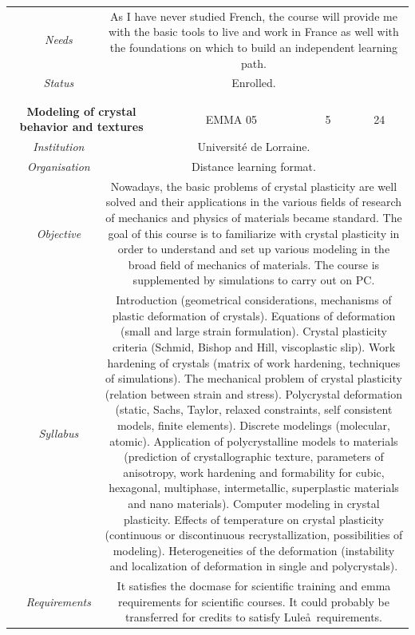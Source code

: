 \documentclass[a4paper, twoside,12pt, abstract]{scrartcl} %
\begin{document}
\begin{center}
\begin{longtable}{cccccc}
   &\textit{Needs}&\multicolumn{4}{p{0.7\textwidth}}{As I have never studied French, the course will provide me with the basic tools to live and work in France as well with the foundations on which to build an independent learning path.}\\
   &\textit{Status}&\multicolumn{4}{p{0.7\textwidth}}{Enrolled.}\\
   &&&&&\\
   \midrule
    &&&&&\\
    \multicolumn{3}{p{0.5\textwidth}}{\textbf{Modeling of crystal behavior and textures}}&EMMA 05&5&24\\
    &\textit{Institution}&\multicolumn{4}{p{0.7\textwidth}}{Universit\'e de Lorraine.}\\
    &\textit{Organisation}&\multicolumn{4}{p{0.7\textwidth}}{Distance learning format.}\\
    &\textit{Objective}&\multicolumn{4}{p{0.7\textwidth}}{Nowadays, the basic problems of crystal plasticity are well solved and their applications in the various fields of research of mechanics and physics of materials became standard. The goal of this course is to familiarize with crystal plasticity in order to understand and set up various modeling in the broad field of mechanics of materials. The course is supplemented by simulations to carry out on PC.}\\
    &\textit{Syllabus}&\multicolumn{4}{p{0.7\textwidth}}{Introduction (geometrical considerations, mechanisms of plastic deformation of crystals). Equations of deformation (small and large strain formulation). Crystal plasticity criteria (Schmid, Bishop and Hill, viscoplastic slip). Work hardening of crystals (matrix of work hardening, techniques of simulations). The mechanical problem of crystal plasticity (relation between strain and stress). Polycrystal deformation (static, Sachs, Taylor, relaxed constraints, self consistent models, finite elements). Discrete modelings (molecular, atomic). Application of polycrystalline models to materials (prediction of crystallographic texture, parameters of anisotropy, work hardening and formability for cubic, hexagonal, multiphase, intermetallic, superplastic materials and nano materials). Computer modeling in crystal plasticity. Effects of temperature on crystal plasticity (continuous or discontinuous recrystallization, possibilities of modeling). Heterogeneities of the deformation (instability and localization of deformation in single and polycrystals).}\\
    &\textit{Requirements}&\multicolumn{4}{p{0.7\textwidth}}{It satisfies the \acrshort{docmase} for scientific training and \acrshort{emma} requirements for scientific courses. It could probably be transferred for credits to satisfy Lule\aa\ requirements.}\\

\end{longtable}
\end{center}
\end{document}
